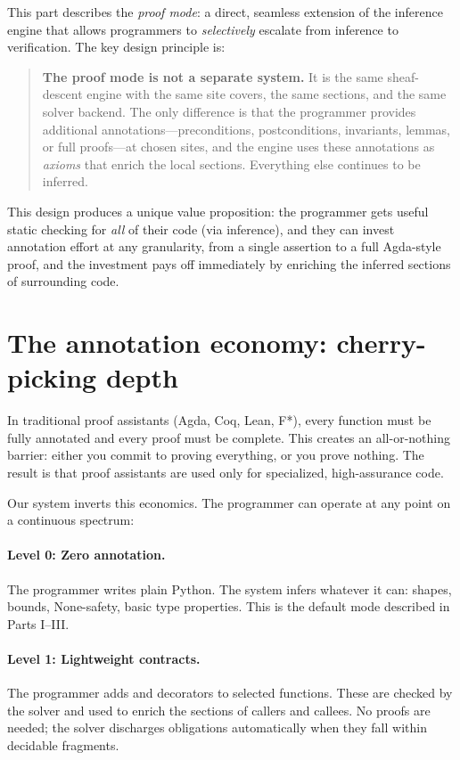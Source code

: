\documentclass[11pt]{report}
\DeclareRobustCommand{\py}[1]{\texttt{\detokenize{#1}}}
\theoremstyle{definition}
\theoremstyle{plain}
\begin{document}
This part describes the \emph{proof mode}: a direct, seamless extension of
the inference engine that allows programmers to \emph{selectively} escalate
from inference to verification. The key design principle is:

\begin{quote}
\textbf{The proof mode is not a separate system.} It is the same
sheaf-descent engine with the same site covers, the same sections, and the
same solver backend. The only difference is that the programmer provides
additional annotations---preconditions, postconditions, invariants, lemmas,
or full proofs---at chosen sites, and the engine uses these annotations as
\emph{axioms} that enrich the local sections. Everything else continues to
be inferred.
\end{quote}

This design produces a unique value proposition: the programmer gets useful
static checking for \emph{all} of their code (via inference), and they can
invest annotation effort at any granularity, from a single assertion to a
full Agda-style proof, and the investment pays off immediately by enriching
the inferred sections of surrounding code.

\section{The annotation economy: cherry-picking depth}

In traditional proof assistants (Agda, Coq, Lean, F*), every function must
be fully annotated and every proof must be complete. This creates an
all-or-nothing barrier: either you commit to proving everything, or you
prove nothing. The result is that proof assistants are used only for
specialized, high-assurance code.

Our system inverts this economics. The programmer can operate at any point on
a continuous spectrum:

\paragraph{Level 0: Zero annotation.}
The programmer writes plain Python. The system infers whatever it can:
shapes, bounds, None-safety, basic type properties. This is the default mode
described in Parts I--III.

\paragraph{Level 1: Lightweight contracts.}
The programmer adds \py{@requires} and \py{@ensures} decorators to selected
functions. These are checked by the solver and used to enrich the sections of
callers and callees. No proofs are needed; the solver discharges obligations
automatically when they fall within decidable fragments.
\end{document}
